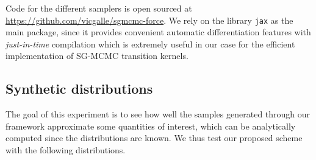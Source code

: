 Code for the different samplers is open sourced at \url{https://github.com/vicgalle/sgmcmc-force}. We rely on the library \texttt{jax} \cite{jax2018github} as the main package, since it provides convenient automatic differentiation features with \emph{just-in-time} compilation which is extremely useful in our case for the efficient implementation of SG-MCMC transition kernels.

\subsection{Synthetic distributions} 
The goal of this experiment is to see how well the samples generated through our framework approximate some quantities of interest, which can be analytically computed since the distributions are known. We thus test our proposed scheme with the following distributions. 


